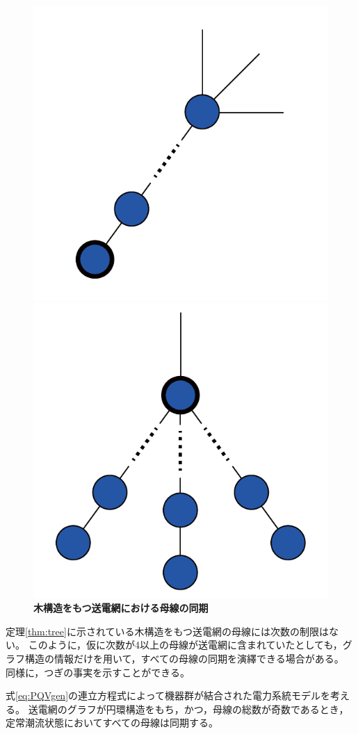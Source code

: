\documentclass[tombow,dvipdfmx]{corona-a5-1.1}
\begin{document}
\begin{figure}[t]
  \centering
  {
  \begin{minipage}{0.40\linewidth}
    \centering
    \includegraphics[width = .50\linewidth]{figs/treesub}
    \subcaption{ }
  \end{minipage}
  \begin{minipage}{0.40\linewidth}
    \centering
    \includegraphics[width = .50\linewidth]{figs/tree}
    \subcaption{ }
  \end{minipage}
  \medskip
  \caption{\textbf{木構造をもつ送電網における母線の同期}}
  \label{fig:treepr}
  }
\medskip
\end{figure}
定理\ref{thm:tree}に示されている木構造をもつ送電網の母線には次数の制限はない。
このように，仮に次数が4以上の母線が送電網に含まれていたとしても，グラフ構造の情報だけを用いて，すべての母線の同期を演繹できる場合がある。
同様に，つぎの事実を示すことができる。

\begin{定理}[円環構造の送電網における母線の同期]
\label{thm:circ}
式\ref{eq:PQVgen}の連立方程式によって機器群が結合された電力系統モデルを考える。
送電網のグラフが円環構造をもち，かつ，母線の総数が奇数であるとき，定常潮流状態においてすべての母線は同期する。
\end{定理}
\end{document}
